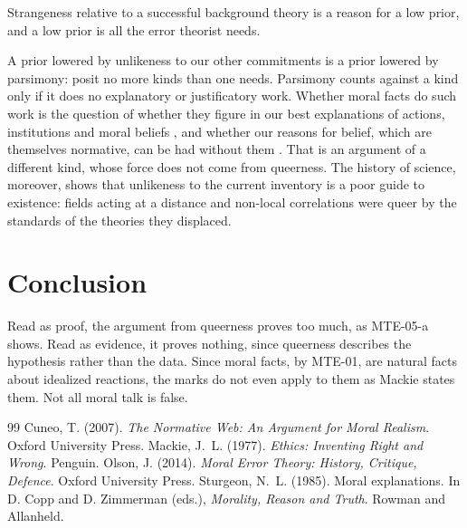 \documentclass{situationist-preprint}
\begin{document}
\begin{objection}
Strangeness relative to a successful background theory is a reason for a low prior, and a low prior is all the error theorist needs.
\end{objection}

\begin{reply}
A prior lowered by unlikeness to our other commitments is a prior lowered by parsimony: posit no more kinds than one needs. Parsimony counts against a kind only if it does no explanatory or justificatory work. Whether moral facts do such work is the question of whether they figure in our best explanations of actions, institutions and moral beliefs \citep{Sturgeon1985}, and whether our reasons for belief, which are themselves normative, can be had without them \citep{Cuneo2007}. That is an argument of a different kind, whose force does not come from queerness. The history of science, moreover, shows that unlikeness to the current inventory is a poor guide to existence: fields acting at a distance and non-local correlations were queer by the standards of the theories they displaced.
\end{reply}

\section{Conclusion}

Read as proof, the argument from queerness proves too much, as MTE-05-a shows. Read as evidence, it proves nothing, since queerness describes the hypothesis rather than the data. Since moral facts, by MTE-01, are natural facts about idealized reactions, the marks do not even apply to them as Mackie states them. Not all moral talk is false.

\begin{thebibliography}{99}\small
{} Cuneo, T. (2007). \emph{The Normative Web: An Argument for Moral Realism}. Oxford University Press.
 Mackie, J.~L. (1977). \emph{Ethics: Inventing Right and Wrong}. Penguin.
 Olson, J. (2014). \emph{Moral Error Theory: History, Critique, Defence}. Oxford University Press.
 Sturgeon, N.~L. (1985). Moral explanations. In D. Copp and D. Zimmerman (eds.), \emph{Morality, Reason and Truth}. Rowman and Allanheld.
\end{thebibliography}
\end{document}
